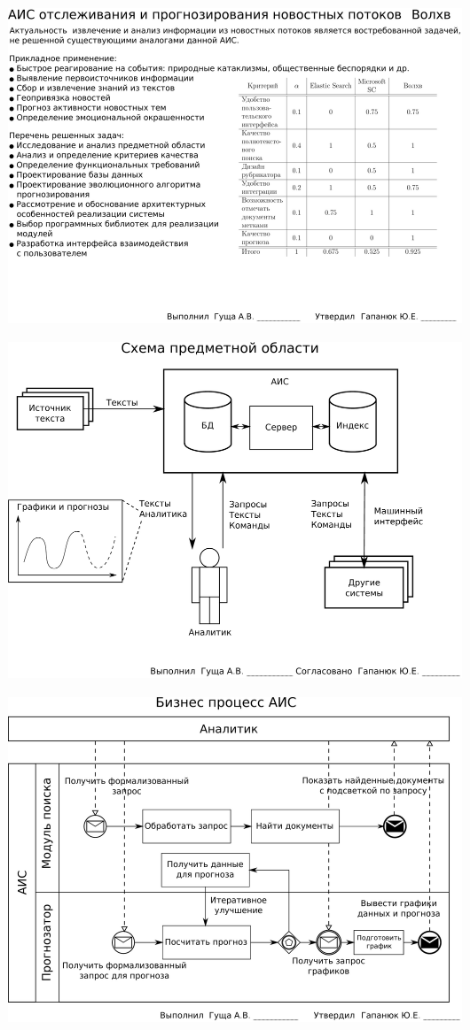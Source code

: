 \documentclass[russian,utf8, a1paper, emptystyle]{eskdgraph}
\begin{document}
\begin{ESKDdrawing}
\includegraphics[width=0.90\textwidth]{lists/list1}
\end{ESKDdrawing}

\begin{ESKDdrawing}
\includegraphics[width=0.90\textwidth]{lists/list2}
\end{ESKDdrawing}

\begin{ESKDdrawing}
\centering
\includegraphics[width=0.90\textwidth]{lists/list12}
\end{ESKDdrawing}
\end{document}
